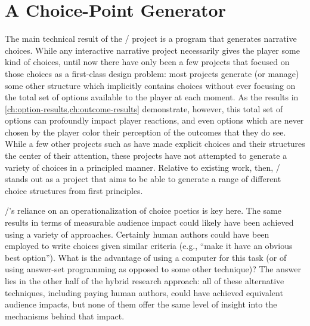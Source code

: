 \section{A Choice-Point Generator}

The main technical result of the \dunyazad/ project is a program that generates narrative choices.
%
While any interactive narrative project necessarily gives the player some kind of choices, until now there have only been a few projects that focused on those choices as a first-class design problem: most projects generate (or manage) some other structure which implicitly contains choices without ever focusing on the total set of options available to the player at each moment.
%
As the results in \cref{ch:option-results,ch:outcome-results} demonstrate, however, this total set of options can profoundly impact player reactions, and even options which are never chosen by the player color their perception of the outcomes that they do see.
%
While a few other projects such as \citep{Barber2007a, Yu2013} have made explicit choices and their structures the center of their attention, these projects have not attempted to generate a variety of choices in a principled manner.
%
Relative to existing work, then, \dunyazad/ stands out as a project that aims to be able to generate a range of different choice structures from first principles.


\dunyazad/'s reliance on an operationalization of choice poetics is key here.
%
The same results in terms of measurable audience impact could likely have been achieved using a variety of approaches.
%
Certainly human authors could have been employed to write choices given similar criteria (e.g., ``make it have an obvious best option'').
%
What is the advantage of using a computer for this task (or of using answer-set programming as opposed to some other technique)?
%
The answer lies in the other half of the hybrid research approach: all of these alternative techniques, including paying human authors, could have achieved equivalent audience impacts, but none of them offer the same level of insight into the mechanisms behind that impact.


